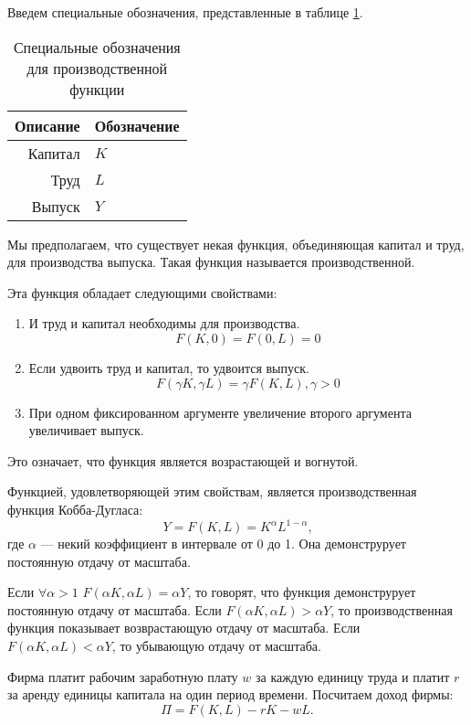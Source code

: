 Введем специальные обозначения, представленные в таблице \ref{tab:prod_func}.
\begin{table}[ht]
	\centering
	\caption{Специальные обозначения для производственной функции}
	\begin{tabular}{|r|l|}
		\hline
		Описание & Обозначение \\ \hline
		Капитал  &      $K$    \\
		Труд     &      $L$    \\
		Выпуск   &      $Y$    \\ \hline
		\end{tabular}%
	\label{tab:prod_func}
\end{table}
Мы предполагаем, что существует некая функция, объединяющая капитал и труд, для производства выпуска.
Такая функция называется производственной.

Эта функция обладает следующими свойствами:
\begin{enumerate}
	\item И труд и капитал необходимы для производства.
	\[
		F(K, 0) = F(0, L) = 0
	\]
	\item Если удвоить труд и капитал, то удвоится выпуск.
	\[
		F(\gamma K, \gamma L) = \gamma F(K, L), \gamma > 0
	\]
	\item При одном фиксированном аргументе увеличение второго аргумента увеличивает выпуск.
\end{enumerate}
Это означает, что функция является возрастающей и вогнутой.

Функцией, удовлетворяющей этим свойствам, является производственная функция Кобба-Дугласа:
\begin{equation}
	Y = F(K, L) = K^{\alpha}L^{1-\alpha}\text{,}
\label{F:Cob_Duglas}
\end{equation}
где $\alpha$ --- некий коэффициент в интервале от 0 до 1.
Она демонструрует постоянную отдачу от масштаба.

Если $\forall \alpha>1$ $F(\alpha K, \alpha L) = \alpha Y$, то говорят, что функция демонструрует постоянную отдачу от масштаба.
Если $F(\alpha K, \alpha L) > \alpha Y$, то производственная функция показывает возврастающую отдачу от масштаба.
Если $F(\alpha K, \alpha L) < \alpha Y$, то убывающую отдачу от масштаба.

Фирма платит рабочим заработную плату $w$ за каждую единицу труда и платит $r$ за аренду единицы капитала на один период времени.
Посчитаем доход фирмы:
\begin{equation*}
	\Pi=F(K, L) - rK - wL\text{.}
\end{equation*}

